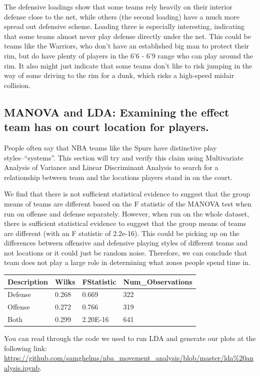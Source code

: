 \documentclass[]{article}
\begin{document}
The defensive loadings show that some teams rely heavily on their
interior defense close to the net, while others (the second loading)
have a much more spread out defensive scheme. Loading three is
especially interesting, indicating that some teams almost never play
defense directly under the net. This could be teams like the Warriors,
who don't have an established big man to protect their rim, but do have
plenty of players in the 6'6 - 6'9 range who can play around the rim. It
also might just indicate that some teams don't like to risk jumping in
the way of some driving to the rim for a dunk, which risks a high-speed
midair collision.

\hypertarget{manova-and-lda-examining-the-effect-team-has-on-court-location-for-players.}{%
\subsection{MANOVA and LDA: Examining the effect team has on court
location for
players.}\label{manova-and-lda-examining-the-effect-team-has-on-court-location-for-players.}}

People often say that NBA teams like the Spurs have distinctive play
styles--``systems''. This section will try and verify this claim using
Multivariate Analysis of Variance and Linear Discriminant Analysis to
search for a relationship between team and the locations players stand
in on the court.

We find that there is not sufficient statistical evidence to suggest
that the group means of teams are different based on the F statistic of
the MANOVA test when run on offense and defense separately. However,
when run on the whole dataset, there is sufficient statistical evidence
to suggest that the group means of teams are different (with an F
statistic of 2.2e-16). This could be picking up on the differences
between offensive and defensive playing styles of different teams and
not locations or it could just be random noise. Therefore, we can
conclude that team does not play a large role in determining what zones
people spend time in.

\begin{longtable}[]{@{}llll@{}}
\toprule
Description & Wilks & FStatistic & Num\_Observations\tabularnewline
\midrule
\endhead
Defense & 0.268 & 0.669 & 322\tabularnewline
Offense & 0.272 & 0.766 & 319\tabularnewline
Both & 0.299 & 2.20E-16 & 641\tabularnewline
\bottomrule
\end{longtable}

You can read through the code we used to run LDA and generate our plots
at the following link:
\url{https://github.com/samghelms/nba_movement_analysis/blob/master/lda\%20analysis.ipynb}.
\end{document}
